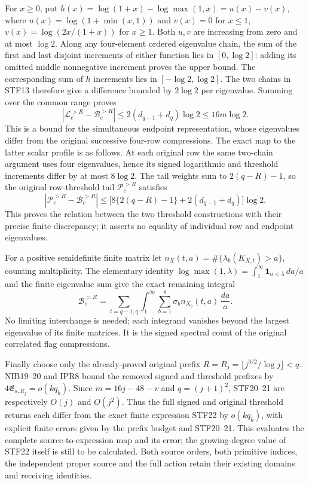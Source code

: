 For $x\ge0$, put $h(x)=\log(1+x)-\log\max(1,x)=u(x)-v(x)$,
where
$u(x)=\log(1+\min(x,1))$ and $v(x)=0$ for $x\le1$,
$v(x)=\log(2x/(1+x))$ for $x\ge1$.
Both $u,v$ are increasing from zero and at most $\log2$.
Along any four-element ordered eigenvalue chain, the sum of the first
and last disjoint increments of either function lies in $[0,\log2]$:
adding its omitted middle nonnegative increment proves the upper bound.
The corresponding sum of $h$ increments lies in $[-\log2,\log2]$.
The two chains in STF13 therefore give a difference bounded by
$2\log2$ per eigenvalue. Summing over the common range proves
\[
 |\mathcal L_e^{>R}-\mathcal B_e^{>R}|
             \le2(d_{q-1}+d_q)\log2\le16m\log2.         \tag{STF20}
\]
This is a bound for the simultaneous endpoint representation, whose
eigenvalues differ from the original successive four-row compressions.
The exact map to the latter scalar profile is as follows. At each
original row the same two-chain argument uses four eigenvalues, hence
its signed logarithmic and threshold increments differ by at most
$8\log2$. The tail weights sum to $2(q-R)-1$, so the original
row-threshold tail $\mathcal P_e^{>R}$ satisfies
\[
 |\mathcal P_e^{>R}-\mathcal B_e^{>R}|
 \le\bigl[8\{2(q-R)-1\}+2(d_{q-1}+d_q)\bigr]\log2.      \tag{STF21}
\]
This proves the relation between the two threshold constructions with
their precise finite discrepancy; it asserts no equality of individual
row and endpoint eigenvalues.

For a positive semidefinite finite matrix let
$n_X(t,a)=\#\{\lambda_b(K_{X,t})>a\}$, counting multiplicity.
The elementary identity
$\log\max(1,\lambda)=\int_1^\infty\mathbf1_{a<\lambda}\,da/a$
and the finite eigenvalue sum give the exact remaining integral
\[
 \mathcal B_e^{>R}
   =\sum_{t=q-1,q}\int_1^\infty
                    \sum_{b=1}^8\sigma_b n_{X_b}(t,a)\,\frac{da}{a}. \tag{STF22}
\]
No limiting interchange is needed; each integrand vanishes beyond
the largest eigenvalue of its finite matrices. It is the signed
spectral count of the original correlated flag compressions.

Finally choose only the already-proved original prefix
$R=R_j=\lfloor j^{3/2}/\log j\rfloor<q$.
NIB19--20 and IPR8 bound the removed signed and threshold prefixes
by $4\mathfrak E_{s,R_j}=o(kq_k)$. Since $m=16j-48-v$ and
$q=(j+1)^2$, STF20--21 are respectively $O(j)$ and $O(j^2)$.
Thus the full signed and original threshold returns each differ
from the exact finite expression STF22 by $o(kq_k)$, with explicit
finite errors given by the prefix budget and STF20--21. This evaluates
the complete source-to-expression map and its error; the growing-degree
value of STF22 itself is still to be calculated. Both source orders,
both primitive indices, the independent proper source and the full
action retain their existing domains and receiving identities.
\endgroup
